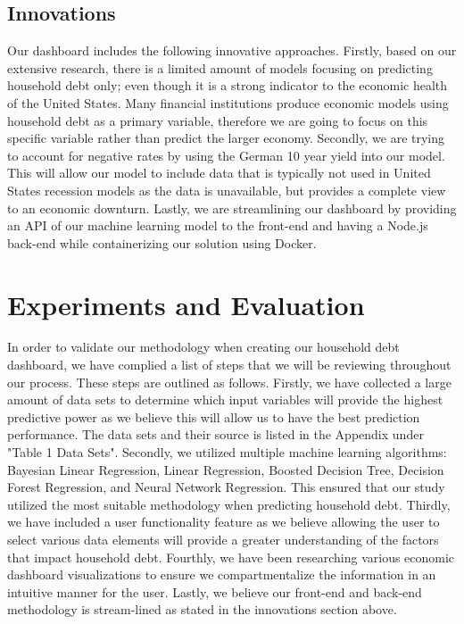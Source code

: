 \documentclass[sigconf,nonacm,11pt]{acmart}
\begin{document}
\vspace{-0.5em}


\subsection{Innovations}

Our dashboard includes the following innovative approaches. Firstly, based on our extensive research, there is a limited amount of models focusing on predicting household debt only; even though it is a strong indicator to the economic health of the United States. Many financial institutions produce economic models using household debt as a primary variable, therefore we are going to focus on this specific variable rather than predict the larger economy. Secondly, we are trying to account for negative rates by using the German 10 year yield into our model. This will allow our model to include data that is typically not used in United States recession models as the data is unavailable, but provides a complete view to an economic downturn. Lastly, we are streamlining our dashboard by providing an API of our machine learning model to the front-end and having a Node.js back-end while containerizing our solution using Docker.\vspace{-0.5em}

\section{Experiments and Evaluation}
In order to validate our methodology when creating our household debt dashboard, we have complied a list of steps that we will be reviewing throughout our process. These steps are outlined as follows. Firstly, we have collected a large amount of data sets to determine which input variables will provide the highest predictive power as we believe this will allow us to have the best prediction performance. The data sets and their source is listed in the Appendix under "Table 1 Data Sets". Secondly, we utilized multiple machine learning algorithms: Bayesian Linear Regression, Linear Regression, Boosted Decision Tree, Decision Forest Regression, and Neural Network Regression. This ensured that our study utilized the most suitable methodology when predicting household debt. Thirdly, we have included a user functionality feature as we believe allowing the user to select various data elements will provide a greater understanding of the factors that impact household debt. Fourthly, we have been researching various economic dashboard visualizations to ensure we compartmentalize the information in an intuitive manner for the user. Lastly, we believe our front-end and back-end methodology is stream-lined as stated in the innovations section above. 
\end{document}
